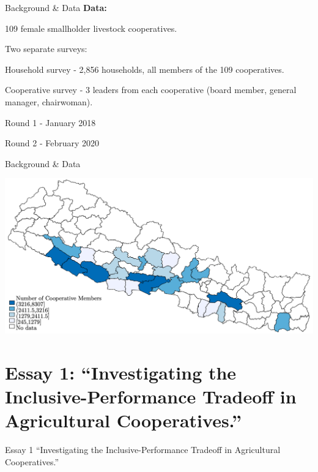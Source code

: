 \documentclass[aspectratio=169]{beamer}
\newenvironment{wideitemize}{\itemize\addtolength{\itemsep}{10pt}}{\enditemize}
\begin{document}
\begin{frame}{Background \& Data}
\textbf{Data:} \vspace{.5cm}
    \begin{wideitemize}
        \item 109 female smallholder livestock cooperatives. 
        \item Two separate surveys: \vspace{.25cm}
            \begin{wideitemize}
                \item Household survey - 2,856 households, all members of the 109 cooperatives.
                \item Cooperative survey - 3 leaders from each cooperative (board member, general manager, chairwoman). 
            \end{wideitemize}
        \item Round 1 - January 2018 
        \item Round 2 - February 2020
    \end{wideitemize}
\end{frame}

\begin{frame}{Background \& Data}
    \begin{center}
        \includegraphics[width=.9\textwidth]{StudyMap.png}
    \end{center}
\end{frame}


\section{Essay 1: ``Investigating the Inclusive-Performance Tradeoff in Agricultural Cooperatives.''}
\begin{frame}{Essay 1}
\centering
\Large{``Investigating the Inclusive-Performance Tradeoff in Agricultural Cooperatives.''}
\end{frame}
\end{document}
